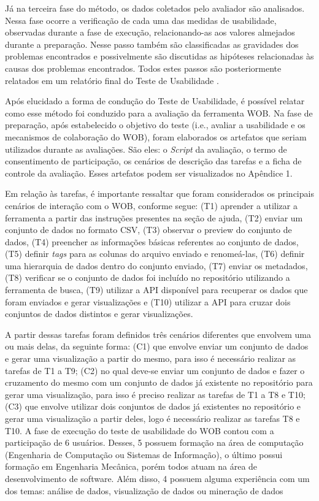 Já na terceira fase do método, os dados coletados pelo avaliador são analisados. Nessa fase 
ocorre a verificação de cada uma das medidas de usabilidade, observadas durante a fase de 
execução, relacionando-as aos valores almejados durante a preparação. Nesse passo também 
são classificadas as gravidades dos problemas encontrados e possivelmente são discutidas as 
hipóteses relacionadas às causas dos problemas encontrados. Todos estes passos são 
posteriormente relatados em um relatório final do Teste de Usabilidade \cite{barbosa2010}.

Após elucidado a forma de condução do Teste de Usabilidade, é possível relatar como esse 
método foi conduzido para a avaliação da ferramenta WOB. Na fase de preparação, após 
estabelecido o objetivo do teste (i.e., avaliar a usabilidade e os mecanismos de 
colaboração do WOB), foram elaborados os artefatos que seriam utilizados durante as 
avaliações. São eles: o \textit{Script} da avaliação, o termo de consentimento de participação, 
os cenários de descrição das tarefas e a ficha de controle da avaliação. Esses artefatos 
podem ser visualizados no Apêndice 1.

Em relação às tarefas, é importante ressaltar que foram considerados os principais cenários de interação com o 
WOB, conforme segue: (T1) aprender a utilizar a ferramenta a partir das instruções presentes 
na seção de ajuda, (T2) enviar um conjunto de dados no formato CSV, (T3) observar o preview 
do conjunto de dados, (T4) preencher as informações básicas referentes ao conjunto de dados, 
(T5) definir \textit{tags} para as colunas do arquivo enviado e renomeá-las, (T6) definir uma 
hierarquia de dados dentro do conjunto enviado, (T7) enviar os metadados, (T8) 
verificar se o conjunto de dados foi incluído no repositório utilizando a 
ferramenta de busca, (T9) utilizar a API disponível para recuperar os dados que foram 
enviados e gerar visualizações e (T10) utilizar a API para cruzar dois conjuntos de 
dados distintos e gerar visualizações. 

A partir dessas tarefas foram definidos três cenários diferentes que envolvem uma ou mais 
delas, da seguinte forma: (C1) que envolve enviar um conjunto de dados e gerar uma 
visualização a partir do mesmo, para isso é necessário realizar as tarefas de T1 a T9; 
(C2) no qual deve-se enviar um conjunto de dados e fazer o cruzamento do mesmo com um 
conjunto de dados já existente no repositório para gerar uma visualização, para isso é 
preciso realizar as tarefas de T1 a T8 e T10; (C3) que envolve utilizar dois conjuntos de 
dados já existentes no repositório e gerar uma visualização a partir deles, logo é 
necessário realizar as tarefas T8 e T10. A fase de execução do teste de usabilidade do 
WOB contou com a participação de 6 usuários. Desses, 5 possuem formação na área de
computação (Engenharia de Computação ou Sistemas de Informação), o último possui 
formação em Engenharia Mecânica, porém todos atuam na área de desenvolvimento de software. 
Além disso, 4 possuem alguma experiência com um dos temas: análise de dados, visualização 
de dados ou mineração de dados

